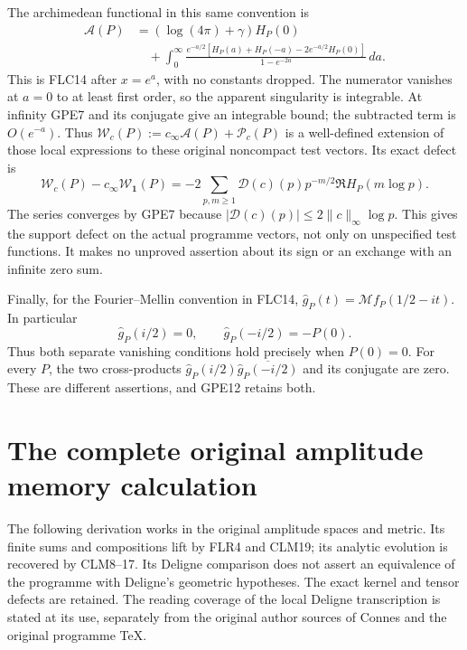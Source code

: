 \documentclass[11pt]{article}
\begin{document}
The archimedean functional in this same convention is
\[
\begin{split}
\mathcal A(P)&=(\log(4\pi)+\gamma)H_P(0)\\
&\quad+\int_0^\infty
 \frac{e^{-a/2}
 [H_P(a)+H_P(-a)-2e^{-a/2}H_P(0)]}{1-e^{-2a}}\,da.
\end{split}
\tag{GPE10}
\]
This is FLC14 after $x=e^a$, with no constants dropped. The numerator
vanishes at $a=0$ to at least first order, so the apparent singularity
is integrable. At infinity GPE7 and its conjugate give an integrable
bound; the subtracted term is $O(e^{-a})$. Thus
$\mathcal W_c(P):=c_\infty\mathcal A(P)+\mathcal P_c(P)$ is a
well-defined extension of those local expressions to these original
noncompact test vectors. Its exact defect is
\[
\boxed{\mathcal W_c(P)-c_\infty\mathcal W_{\mathbf1}(P)
 =-2\sum_{p,m\ge1}\mathscr D(c)(p)p^{-m/2}
                                  \Re H_P(m\log p).}
\tag{GPE11}
\]
The series converges by GPE7 because
$|\mathscr D(c)(p)|\le2\|c\|_\infty\log p$.
This gives the support defect on the actual programme vectors, not
only on unspecified test functions. It makes no unproved assertion
about its sign or an exchange with an infinite zero sum.

Finally, for the Fourier--Mellin convention in FLC14,
$\widehat g_P(t)=\mathcal M f_P(1/2-it)$. In particular
\[
\widehat g_P(i/2)=0,\qquad
\widehat g_P(-i/2)=-P(0).
\tag{GPE12}
\]
Thus both separate vanishing conditions hold precisely when $P(0)=0$.
For every $P$, the two cross-products
$\widehat g_P(i/2)\overline{\widehat g_P(-i/2)}$ and its conjugate
are zero. These are different assertions, and GPE12 retains both.



\appendix
\section{The complete original amplitude memory calculation}
The following derivation works in the original amplitude spaces and
metric. Its finite sums and compositions lift by FLR4 and CLM19; its
analytic evolution is recovered by CLM8--17. Its Deligne comparison
does not assert an equivalence of the programme with Deligne's
geometric hypotheses. The exact kernel and tensor defects are
retained. The reading coverage of the local Deligne transcription is
stated at its use, separately from the original author sources of
Connes and the original programme TeX.

\end{document}
